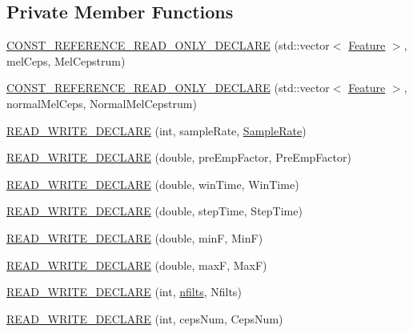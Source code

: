 \subsection*{Private Member Functions}
\begin{DoxyCompactItemize}
\item 
\hyperlink{class_feature_extractor_afd77d9ae1afaf55e10d962c3796af005}{C\+O\+N\+S\+T\+\_\+\+R\+E\+F\+E\+R\+E\+N\+C\+E\+\_\+\+R\+E\+A\+D\+\_\+\+O\+N\+L\+Y\+\_\+\+D\+E\+C\+L\+A\+R\+E} (std\+::vector$<$ \hyperlink{class_feature}{Feature} $>$, mel\+Ceps, Mel\+Cepstrum)
\item 
\hyperlink{class_feature_extractor_a2e7428408c1bcd29f46a371893cfa32f}{C\+O\+N\+S\+T\+\_\+\+R\+E\+F\+E\+R\+E\+N\+C\+E\+\_\+\+R\+E\+A\+D\+\_\+\+O\+N\+L\+Y\+\_\+\+D\+E\+C\+L\+A\+R\+E} (std\+::vector$<$ \hyperlink{class_feature}{Feature} $>$, normal\+Mel\+Ceps, Normal\+Mel\+Cepstrum)
\item 
\hyperlink{class_feature_extractor_afc5100fc7b50baa27985609e9909f283}{R\+E\+A\+D\+\_\+\+W\+R\+I\+T\+E\+\_\+\+D\+E\+C\+L\+A\+R\+E} (int, sample\+Rate, \hyperlink{readwave_8h_a3b233521f20f9eae6e9ede3f5cb6eae2}{Sample\+Rate})
\item 
\hyperlink{class_feature_extractor_a764c12f4722ff48dc190fbf76a97d1cf}{R\+E\+A\+D\+\_\+\+W\+R\+I\+T\+E\+\_\+\+D\+E\+C\+L\+A\+R\+E} (double, pre\+Emp\+Factor, Pre\+Emp\+Factor)
\item 
\hyperlink{class_feature_extractor_a2f9fe3ac57eac15ea684197e9395b1c4}{R\+E\+A\+D\+\_\+\+W\+R\+I\+T\+E\+\_\+\+D\+E\+C\+L\+A\+R\+E} (double, win\+Time, Win\+Time)
\item 
\hyperlink{class_feature_extractor_a38fcdae1c86f8752ee498a6810cb3e9d}{R\+E\+A\+D\+\_\+\+W\+R\+I\+T\+E\+\_\+\+D\+E\+C\+L\+A\+R\+E} (double, step\+Time, Step\+Time)
\item 
\hyperlink{class_feature_extractor_afb29c97fb7baeedbb726dee40dccc863}{R\+E\+A\+D\+\_\+\+W\+R\+I\+T\+E\+\_\+\+D\+E\+C\+L\+A\+R\+E} (double, min\+F, Min\+F)
\item 
\hyperlink{class_feature_extractor_a293a32c4a66ee1b9738fee81094fc23e}{R\+E\+A\+D\+\_\+\+W\+R\+I\+T\+E\+\_\+\+D\+E\+C\+L\+A\+R\+E} (double, max\+F, Max\+F)
\item 
\hyperlink{class_feature_extractor_aaaeabf91dc03835dddbf9c6cc5515fd8}{R\+E\+A\+D\+\_\+\+W\+R\+I\+T\+E\+\_\+\+D\+E\+C\+L\+A\+R\+E} (int, \hyperlink{fft2barkmx_8m_a1000a3e6abd44974a7db7c36740ffa11}{nfilts}, Nfilts)
\item 
\hyperlink{class_feature_extractor_a3460525b742becfd9743557dd113314d}{R\+E\+A\+D\+\_\+\+W\+R\+I\+T\+E\+\_\+\+D\+E\+C\+L\+A\+R\+E} (int, ceps\+Num, Ceps\+Num)
\end{DoxyCompactItemize}
